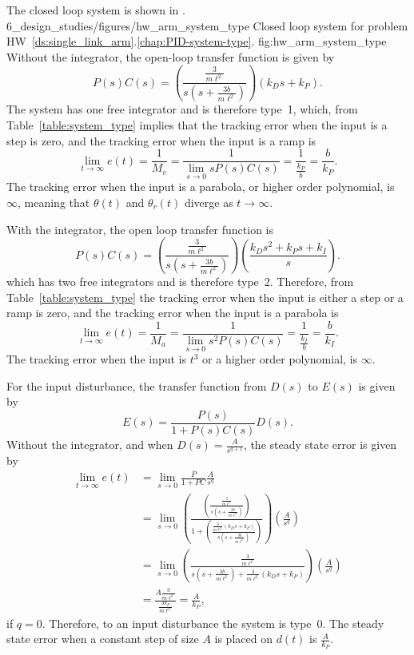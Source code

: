 The closed loop system is shown in .
	{6_design_studies/figures/hw_arm_system_type}
	{Closed loop system for problem HW~\ref{ds:single_link_arm}.\ref{chap:PID-system-type}.}
	{fig:hw_arm_system_type}
Without the integrator, the open-loop transfer function is given by
\[
P(s)C(s) = \left(\frac{\frac{3}{m\ell^2}}{s(s+\frac{3b}{m\ell^2})}\right)\left(k_D s + k_P\right).
\]
The system has one free integrator and is therefore type~1, which, from Table~\ref{table:system_type} implies that the tracking error when the input is a step is zero, and the tracking error when the input is a ramp is
\[
\lim_{t\to\infty}e(t) = \frac{1}{M_v} = \frac{1}{\lim_{s\to 0} sP(s)C(s)} = \frac{1}{\frac{k_P}{b}} = \frac{b}{k_P}.
\]
The tracking error when the input is a parabola, or higher order polynomial, is $\infty$, meaning that $\theta(t)$ and $\theta_r(t)$ diverge as $t\to\infty$.

With the integrator, the open loop transfer function is
\[
P(s)C(s) = \left(\frac{\frac{3}{m\ell^2}}{s(s+\frac{3b}{m\ell^2})}\right)\left(\frac{k_D s^2 + k_Ps + k_I}{s}\right).
\]
which has two free integrators and is therefore type~2. Therefore, from Table~\ref{table:system_type} the tracking error when the input is either a step or a ramp is zero, and the tracking error when the input is a parabola is
\[
\lim_{t\to\infty}e(t) = \frac{1}{M_a} = \frac{1}{\lim_{s\to 0} s^2P(s)C(s)} = \frac{1}{\frac{k_I}{b}} = \frac{b}{k_I}.
\]
The tracking error when the input is $t^3$ or a higher order polynomial, is $\infty$.

For the input disturbance, the transfer function from $D(s)$ to $E(s)$ is given by
\[
E(s) = \frac{P(s)}{1+P(s)C(s)}D(s).
\]
Without the integrator, and when $D(s)= \frac{A}{s^{q+1}}$, the steady state error is given by
\begin{align*}
\lim_{t\to\infty} e(t) &= \lim_{s\to 0} \frac{P}{1+PC}\frac{A}{s^q} \\
&= \lim_{s\to 0} \left(\frac{\left(\frac{\frac{3}{m\ell^2}}{s(s+\frac{3b}{m\ell^2})}\right)}{1+\left(\frac{\frac{3}{m\ell^2}(k_Ds+k_P)}{s(s+\frac{3b}{m\ell^2})}\right)}\right)\left(\frac{A}{s^q}\right) \\
&= \lim_{s\to 0} \left(\frac{\frac{3}{m\ell^2}}{s(s+\frac{3b}{m\ell^2})+\frac{3}{m\ell^2}(k_Ds+k_P)}\right)\left(\frac{A}{s^q}\right) \\
&= \frac{A\frac{3}{m\ell^2}}{\frac{3k_P}{m\ell^2}}
= \frac{A}{k_P},
\end{align*}
if $q=0$.  Therefore, to an input disturbance the system is type~0.  The steady state error when a constant step of size $A$ is placed on $d(t)$ is $\frac{A}{k_P}$.  

